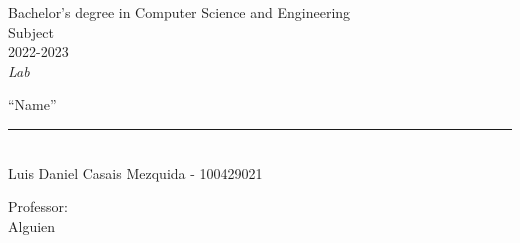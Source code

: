 \begin{titlepage}
	\begin{sffamily}
	\color{azulUC3M}
	\begin{center}
		\begin{figure}[H]
		\end{figure}
		\vspace{1.5cm}
		\begin{Large}
			Bachelor's degree in Computer Science and Engineering\\
            Subject\\
			2022-2023\\
			\vspace{2cm}		
			\textsl{Lab}
			\bigskip
			
		\end{Large}
		 	{\Huge ``Name''}\\
		 	\vspace*{0.5cm}
	 		\rule{10.5cm}{0.1mm}\\
			\vspace*{0.9cm}
			{\LARGE Luis Daniel Casais Mezquida - 100429021}\\
			\vspace*{0.2cm}
			
			\vspace*{0.8cm}
		\begin{Large}
		    Professor:\\
			Alguien\\
		\end{Large}
	\end{center}
	\vfill

	\end{sffamily}
\end{titlepage}